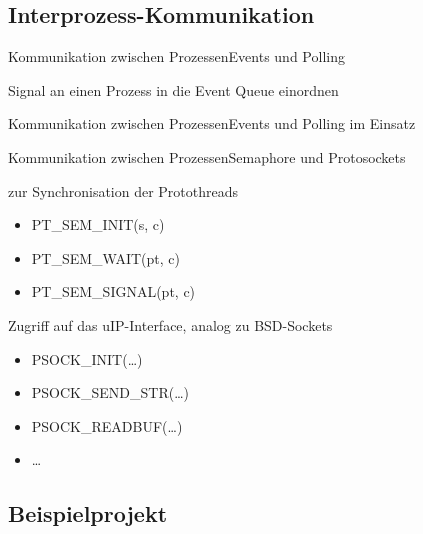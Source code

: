 \subsection{Interprozess-Kommunikation}
\begin{frame}{Kommunikation zwischen Prozessen}{Events und Polling}
	\begin{description}[Event]
	\item[Event]
		Signal an einen Prozess in die Event Queue einordnen
		

	\end{description}
\end{frame}
\begin{frame}{Kommunikation zwischen Prozessen}{Events und Polling im Einsatz}
	
\end{frame}
\begin{frame}{Kommunikation zwischen Prozessen}{Semaphore und Protosockets}
	\begin{description}[Protosockets]
	\item[Semaphore]
		zur Synchronisation der Protothreads
		\begin{itemize}
		\item	PT\_SEM\_INIT(s, c)
		\item	PT\_SEM\_WAIT(pt, c)
		\item	PT\_SEM\_SIGNAL(pt, c)
		\end{itemize}
	\item[Protosockets]
		Zugriff auf das uIP-Interface, analog zu BSD-Sockets
		\begin{itemize}
		\item	PSOCK\_INIT(\dots)
		\item	PSOCK\_SEND\_STR(\dots)
		\item	PSOCK\_READBUF(\dots)
		\item	\dots
		\end{itemize}
	\end{description}
\end{frame}

\subsection{Beispielprojekt}

